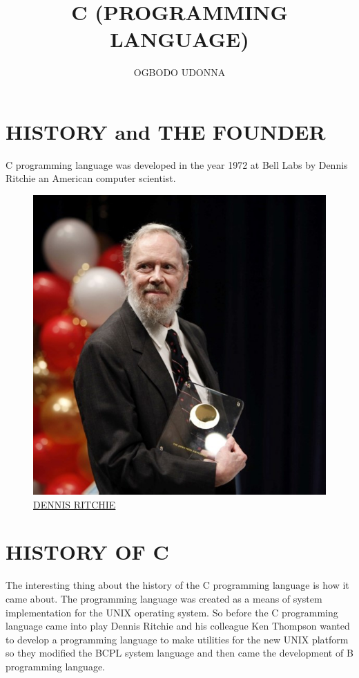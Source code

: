 \documentclass{article}
\title{C (PROGRAMMING LANGUAGE)}
\author{OGBODO UDONNA}
\begin{document}
	\section{HISTORY and THE FOUNDER } C programming language was developed in the year 1972 at Bell Labs by Dennis Ritchie an American computer scientist. 
\begin{figure}
	\includegraphics{DENNISM}
	\caption{ \underline{DENNIS RITCHIE}}
	\label{fig:dennism}
\end{figure}
\section{HISTORY OF C} The interesting thing about the history of the C programming language is how it came about. The programming language was created as a means of system implementation for the UNIX operating system.
So before the C programming language came into play Dennis Ritchie and his colleague Ken Thompson wanted to develop a programming language to make utilities for the new UNIX platform so they modified the BCPL system language and then came the development of B programming language.

	
\end{document}
